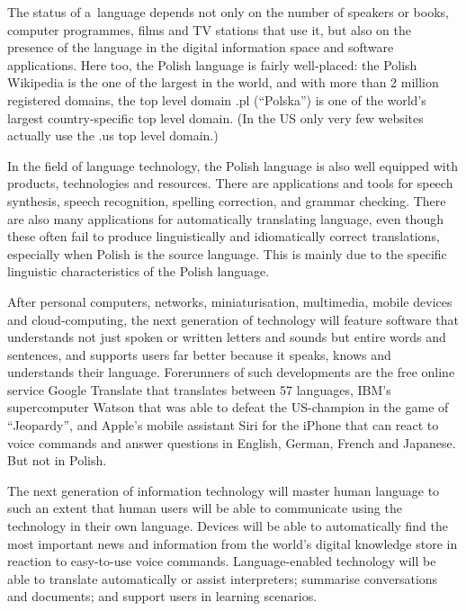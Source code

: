 \begin{multicols}{2}
The status of a~language depends not only on the number of speakers or
books, computer programmes, films and TV stations that use it, but
also on the presence of the language in the digital information space
and software applications. Here too, the Polish language is fairly
well-placed: the Polish Wikipedia is the one of the largest in the
world, and with more than 2 million registered domains, the top level
domain .pl (“Polska”) is one of the world’s largest
country-specific top level domain. (In the US only very few websites
actually use the .us top level domain.)

In the field of language technology, the Polish language is also well
equipped with products, technologies and resources. There are
applications and tools for speech synthesis, speech recognition,
spelling correction, and grammar checking. There are also many
applications for automatically translating language, even though these
often fail to produce linguistically and idiomatically correct
translations, especially when Polish is the source language. This is
mainly due to the specific linguistic characteristics of the Polish
language. 


After personal computers, networks, miniaturisation, multimedia,
mobile devices and cloud-computing, the next generation of technology
will feature software that understands not just spoken or written
letters and sounds but entire words and sentences, and supports users
far better because it speaks, knows and understands their language.
Forerunners of such developments are the free online service Google
Translate that translates between 57 languages, IBM’s supercomputer
Watson that was able to defeat the US-champion in the game of
“Jeopardy”, and Apple’s mobile assistant Siri for the iPhone
that can react to voice commands and answer questions in English,
German, French and Japanese. But not in Polish. 

The next generation of information technology will master human
language to such an extent that human users will be able to
communicate using the technology in their own language. Devices will
be able to automatically find the most important news and information
from the world’s digital knowledge store in reaction to easy-to-use
voice commands. Language-enabled technology will be able to translate
automatically or assist interpreters; summarise conversations and
documents; and support users in learning scenarios. 


\end{multicols}
